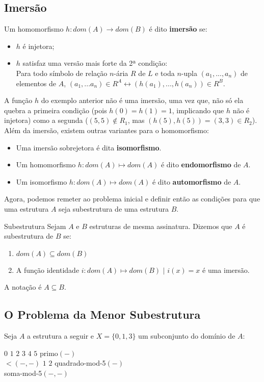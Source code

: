 \subsection{Imersão}
Um homomorfismo $h: dom(A) \rightarrow dom(B)$ é dito \textbf{imersão} se:
\begin{itemize}
    \item $h$ é injetora;
    \item $h$ satisfaz uma versão mais forte da 2ª condição:
    \\ Para todo símbolo de relação $n$-ária $R$ de $L$ e toda $n$-upla $(a_1,...,a_n)$ de elementos de $A$, $(a_1,...a_n) \in R^A \leftrightarrow (h(a_1),...,h(a_n)) \in R^B$.
\end{itemize}
A função $h$ do exemplo anterior não é uma imersão, uma vez que, não só ela quebra a primeira condição (pois $h(0) = h(1) = 1$, implicando que $h$ não é injetora) como a segunda ($(5,5) \notin R_1$, mas $(h(5),h(5)) = (3,3) \in R_2$).
Além da imersão, existem outras variantes para o homomorfismo:
\begin{itemize}
    \item Uma imersão sobrejetora é dita \textbf{isomorfismo}.
    \item Um homomorfismo $h: dom(A) \mapsto dom(A)$ é dito \textbf{endomorfismo} de $A$.
    \item Um isomorfismo $h: dom(A) \mapsto dom(A)$ é dito \textbf{automorfismo} de $A$.
\end{itemize}

Agora, podemos remeter ao problema inicial e definir então as condições para que uma estrutura $A$ seja subestrutura de uma estrutura $B$.
\begin{definition}{Subestrutura}
    Sejam $A$ e $B$ estruturas de mesma assinatura. Dizemos que $A$ é subestrutura de $B$ se:
    \begin{enumerate}
        \item $dom(A) \subseteq dom(B)$
        \item A função identidade $i: dom(A) \mapsto dom(B)$ $|$ $i(x) = x$ é uma imersão.
    \end{enumerate}
    A notação é $A \subseteq B$.
\end{definition}

\subsection{O Problema da Menor Subestrutura}

Seja $A$ a estrutura a seguir e $X = \{0,1,3\}$ um subconjunto do domínio de $A$:
\begin{center}
    \begin{structure}
        {}
        {$0$ $1$ $2$ $3$ $4$ $5$}
        {primo$(-)$\\$<$$(-,-)$}
        {$1$ $2$}
        {quadrado-mod-5$(-)$\\soma-mod-5$(-,-)$}
    \end{structure} 
\end{center}

